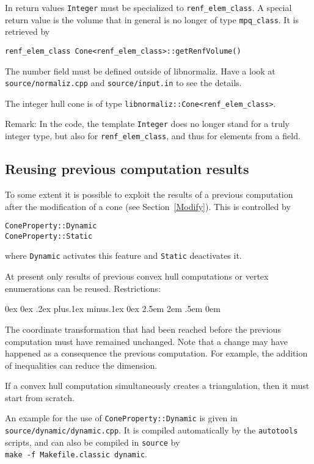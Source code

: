 \documentclass[12pt,a4paper]{scrartcl}
\newcounter{listi}
\newcommand{\stdli}{ \topsep0ex \partopsep0ex %
\parsep.2ex plus.1ex minus.1ex \itemsep0ex%
\leftmargin2.5em \labelwidth2em \labelsep.5em \rightmargin0em}%
\newenvironment{arab}{\begin{list}{\textup{(\arabic{listi})}}%
	{\usecounter{listi}\stdli}}{\end{list}}
\theoremstyle{definition}
\def\ttt{\texttt}
\begin{document}
\begin{small}
In return values \ttt{Integer} must be specialized to \verb|renf_elem_class|. A special return value is the volume that in general is no longer of type \verb|mpq_class|. It is retrieved by
\begin{Verbatim}
renf_elem_class Cone<renf_elem_class>::getRenfVolume() 
\end{Verbatim}

The number field must be defined outside of libnormaliz. Have a look at \verb|source/normaliz.cpp| and \verb|source/input.in| to see the details.

The integer hull cone is of type \verb|libnormaliz::Cone<renf_elem_class>|.

Remark: In the code, the template \ttt{Integer} does no longer stand for a truly integer type, but also for \verb|renf_elem_class|, and thus for elements from a field.

\subsection{Reusing previous computation results}

To some extent it is possible to exploit the results of a previous computation after the modification of a cone (see Section~\ref{Modify}). This is controlled by
\begin{Verbatim}
ConeProperty::Dynamic
ConeProperty::Static
\end{Verbatim}
where \verb|Dynamic| activates this feature and \verb|Static| deactivates it.

At present only results of previous convex hull computations or vertex enumerations can be reused. Restrictions:
\begin{arab}
	\item The coordinate transformation that had been reached before the previous computation must have remained unchanged. Note that a change may have happened as a consequence the previous computation. For example, the addition of inequalities can reduce the dimension.
	\item If a convex hull computation simultaneously creates a triangulation, then it must start from scratch.
\end{arab}

An example for the use of \verb|ConeProperty::Dynamic| is given in \verb|source/dynamic/dynamic.cpp|. It is compiled automatically by the \verb|autotools| scripts, and can also be compiled in \verb|source| by\\ \verb|make -f Makefile.classic dynamic|.


\end{small}
\end{document}
